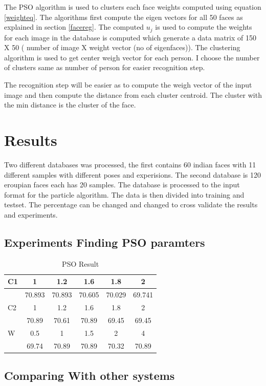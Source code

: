 \documentclass[a4paper,twoside]{article}
\begin{document}
The PSO algorithm is used to clusters each face weights computed using equation \ref{weighteq}. The algorithms first compute the eigen vectors for all 50 faces as explained in section \ref{facereg}. The computed $u_j$ is used to compute the weights for each image in the database is computed which generate a data matrix of 150 X 50 ( number of image X weight vector (no of eigenfaces)). The clustering algorithm is used to get center weigh vector for each person. I choose the number of clusters same as number of person for easier recognition step.


The recognition step will be easier as to compute the weigh vector of the input image and then compute the distance from each cluster centroid. The cluster with the min distance is the cluster of the face.

\section{Results}
\label{sec:Results}
Two different databases \cite{JainMukherjeeIndianFaceDB}was processed, the first
contains 60 indian faces with 11 different samples with different poses and experisions. The second database is 120 eroupian faces each has 20 samples. The database is processed to the input format for the particle algorithm. The data is then divided into training and testset. The percentage can be changed and changed to cross validate the results and experiments.

\subsection{Experiments Finding PSO paramters}
\begin{table}
	\centering
		\caption{PSO Result }
	\label{tab:PSO1}
		\begin{tabular}{|l|c|c|c|c|c|}
		 \hline
C1 &	1	&1.2&	1.6&	1.8 &	2	\\ \hline
	&70.893	&70.893	&70.605	&70.029	&69.741 \\  \hline
C2	&	1	&1.2&	1.6&	1.8 &	2	\\ \hline
	&70.89	&70.61	&70.89	&69.45	&69.45 \\ \hline
W	&0.5&	1	&1.5	&2&	4	\\ \hline
	&69.74	&70.89&	70.89	&70.32&	70.89	\\ \hline
\end{tabular}
\end{table}


\subsection {Comparing With other systems}
\end{document}
